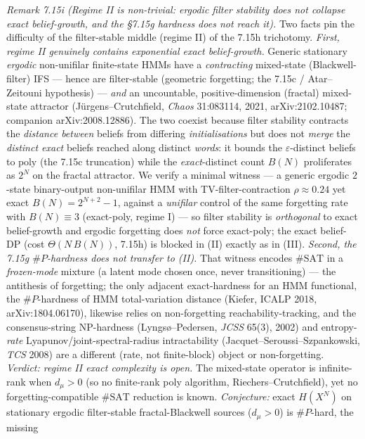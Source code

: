 \documentclass[
]{article}
\begin{document}
\emph{Remark 7.15i (Regime II is non-trivial: ergodic filter stability does not collapse exact
belief-growth, and the §7.15g hardness does not reach it).} Two facts pin the difficulty of the
filter-stable middle (regime II) of the 7.15h trichotomy. \emph{First, regime II genuinely contains
exponential exact belief-growth.} Generic stationary \emph{ergodic} non-unifilar finite-state HMMs have
a \emph{contracting} mixed-state (Blackwell-filter) IFS --- hence are filter-stable (geometric
forgetting; the 7.15c / Atar--Zeitouni hypothesis) --- \emph{and} an uncountable, positive-dimension
(fractal) mixed-state attractor (J\"urgens--Crutchfield, \emph{Chaos} 31:083114, 2021,
arXiv:2102.10487; companion arXiv:2008.12886). The two coexist because filter stability contracts the
\emph{distance between} beliefs from differing \emph{initialisations} but does not \emph{merge} the
\emph{distinct exact} beliefs reached along distinct \emph{words}: it bounds the $\varepsilon$-distinct
beliefs to $\mathrm{poly}$ (the 7.15c truncation) while the \emph{exact}-distinct count $B(N)$
proliferates as $2^N$ on the fractal attractor. We verify a minimal witness --- a generic ergodic
$2$-state binary-output non-unifilar HMM with TV-filter-contraction $\rho\approx0.24$ yet exact
$B(N)=2^{N+2}-1$, against a \emph{unifilar} control of the same forgetting rate with $B(N)\equiv3$
(exact-poly, regime I) --- so filter stability is \emph{orthogonal} to exact belief-growth and ergodic
forgetting does \emph{not} force exact-poly; the exact belief-DP (cost $\Theta(N\,B(N))$, 7.15h) is
blocked in (II) exactly as in (III). \emph{Second, the 7.15g $\#P$-hardness does not transfer to (II).}
That witness encodes $\#\mathrm{SAT}$ in a \emph{frozen-mode} mixture (a latent mode chosen once, never
transitioning) --- the antithesis of forgetting; the only adjacent exact-hardness for an HMM functional,
the $\#P$-hardness of HMM total-variation distance (Kiefer, ICALP 2018, arXiv:1804.06170), likewise
relies on non-forgetting reachability-tracking, and the consensus-string $\mathrm{NP}$-hardness
(Lyngs\o--Pedersen, \emph{JCSS} 65(3), 2002) and entropy-\emph{rate} Lyapunov/joint-spectral-radius
intractability (Jacquet--Seroussi--Szpankowski, \emph{TCS} 2008) are a different (rate, not finite-block)
object or non-forgetting. \emph{Verdict: regime II exact complexity is open.} The mixed-state operator is
infinite-rank when $d_\mu>0$ (so no finite-rank poly algorithm, Riechers--Crutchfield), yet no
forgetting-compatible $\#\mathrm{SAT}$ reduction is known. \emph{Conjecture:} exact $H(X^N)$ on
stationary ergodic filter-stable fractal-Blackwell sources ($d_\mu>0$) is $\#P$-hard, the missing
\end{document}
